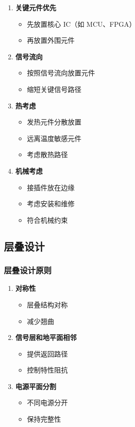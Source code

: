 \begin{enumerate}
  \item \textbf{关键元件优先}
    \begin{itemize}
      \item 先放置核心 IC（如 MCU、FPGA）
      \item 再放置外围元件
    \end{itemize}

  \item \textbf{信号流向}
    \begin{itemize}
      \item 按照信号流向放置元件
      \item 缩短关键信号路径
    \end{itemize}

  \item \textbf{热考虑}
    \begin{itemize}
      \item 发热元件分散放置
      \item 远离温度敏感元件
      \item 考虑散热路径
    \end{itemize}

  \item \textbf{机械考虑}
    \begin{itemize}
      \item 接插件放在边缘
      \item 考虑安装和维修
      \item 符合机械约束
    \end{itemize}
\end{enumerate}

\subsection{层叠设计}

\subsubsection{层叠设计原则}

\begin{enumerate}
  \item \textbf{对称性}
    \begin{itemize}
      \item 层叠结构对称
      \item 减少翘曲
    \end{itemize}

  \item \textbf{信号层和地平面相邻}
    \begin{itemize}
      \item 提供返回路径
      \item 控制特性阻抗
    \end{itemize}

  \item \textbf{电源平面分割}
    \begin{itemize}
      \item 不同电源分开
      \item 保持完整性
    \end{itemize}
\end{enumerate}

